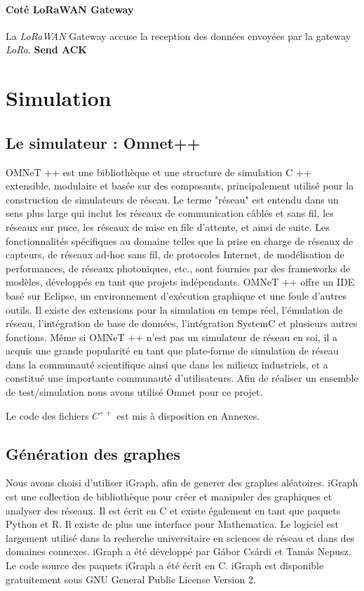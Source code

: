 \documentclass[11pt]{article}
\begin{document}
\paragraph{Coté LoRaWAN Gateway}
La \textit{LoRaWAN} Gateway accuse la reception des données envoyées par la gateway \textit{LoRa}.
\textbf{Send ACK}


\newpage
\section{Simulation}

\subsection{Le simulateur : Omnet++}
OMNeT ++ est une bibliothèque et une structure de simulation C ++ extensible, modulaire et basée sur des composants, principalement utilisé pour la construction de simulateurs de réseau. Le terme "réseau" est entendu dans un sens plus large qui inclut les réseaux de communication câblés et sans fil, les réseaux sur puce, les réseaux de mise en file d'attente, et ainsi de suite. Les fonctionnalités spécifiques au domaine telles que la prise en charge de réseaux de capteurs, de réseaux ad-hoc sans fil, de protocoles Internet, de modélisation de performances, de réseaux photoniques, etc., sont fournies par des frameworks de modèles, développés en tant que projets indépendants. OMNeT ++ offre un IDE basé sur Eclipse, un environnement d'exécution graphique et une foule d'autres outils. Il existe des extensions pour la simulation en temps réel, l'émulation de réseau, l'intégration de base de données, l'intégration SystemC et plusieurs autres fonctions.
Même si OMNeT ++ n'est pas un simulateur de réseau en soi, il a acquis une grande popularité en tant que plate-forme de simulation de réseau dans la communauté scientifique ainsi que dans les milieux industriels, et a constitué une importante communauté d'utilisateurs.
Afin de réaliser un ensemble de test/simulation nous avons utilisé Omnet pour ce projet.

Le code des fichiers $C^{++}$ est mis à disposition en Annexes.
\subsection{Génération des graphes}
Nous avons choisi d'utiliser iGraph, afin de generer des graphes aléatoires.
iGraph est une collection de bibliothèque pour créer et manipuler des graphiques et analyser des réseaux. Il est écrit en C et existe également en tant que paquets Python et R. Il existe de plus une interface pour Mathematica. Le logiciel est largement utilisé dans la recherche universitaire en sciences de réseau et dans des domaines connexes.
iGraph a été développé par Gábor Csárdi et Tamás Nepusz. Le code source des paquets iGraph a été écrit en C. iGraph est disponible gratuitement sous GNU General Public License Version 2.
\end{document}
